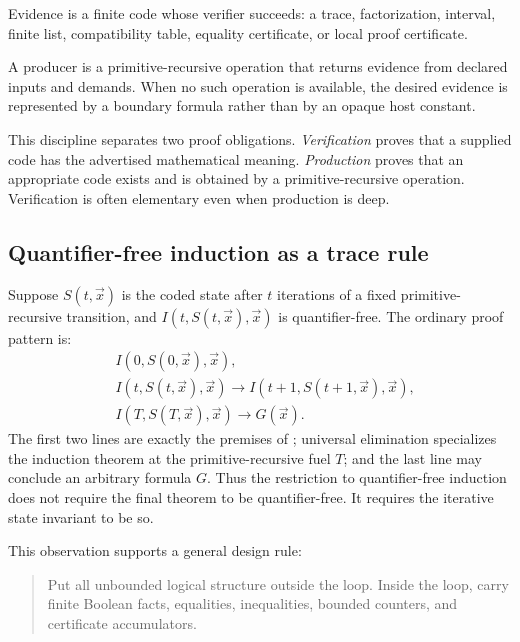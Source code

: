 \begin{definition}[Evidence]
Evidence is a finite code whose verifier succeeds: a trace, factorization, interval, finite list, compatibility table, equality certificate, or local proof certificate.
\end{definition}

\begin{definition}[Producer]
A producer is a primitive-recursive operation that returns evidence from declared inputs and demands.  When no such operation is available, the desired evidence is represented by a boundary formula rather than by an opaque host constant.
\end{definition}

This discipline separates two proof obligations.  \emph{Verification} proves that a supplied code has the advertised mathematical meaning.  \emph{Production} proves that an appropriate code exists and is obtained by a primitive-recursive operation.  Verification is often elementary even when production is deep.

\subsection{Quantifier-free induction as a trace rule}

Suppose \(S(t,\vec x)\) is the coded state after \(t\) iterations of a fixed primitive-recursive transition, and \(I(t,S(t,\vec x),\vec x)\) is quantifier-free.  The ordinary proof pattern is:
\begin{align*}
 &I(0,S(0,\vec x),\vec x),\\
 &I(t,S(t,\vec x),\vec x)\to I(t+1,S(t+1,\vec x),\vec x),\\
 &I(T,S(T,\vec x),\vec x)\to G(\vec x).
\end{align*}
The first two lines are exactly the premises of ; universal elimination specializes the induction theorem at the primitive-recursive fuel \(T\); and the last line may conclude an arbitrary formula \(G\).  Thus the restriction to quantifier-free induction does not require the final theorem to be quantifier-free.  It requires the iterative state invariant to be so.

This observation supports a general design rule:

\begin{quote}
Put all unbounded logical structure outside the loop.  Inside the loop, carry finite Boolean facts, equalities, inequalities, bounded counters, and certificate accumulators.
\end{quote}

